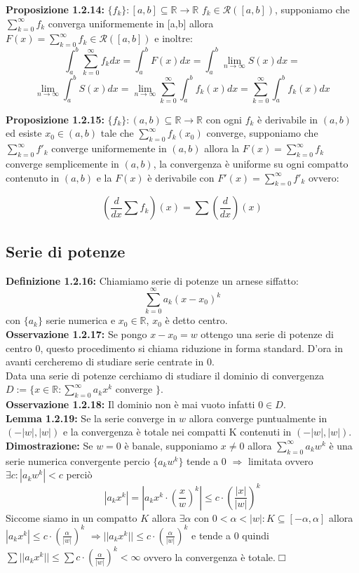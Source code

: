 \documentclass[a4paper,11pt,titlepage]{book}
\begin{document}
\textbf{Proposizione 1.2.14:}  $\{f_{k}\}:[a,b]\subseteq\mathbb{R}\to\mathbb{R}$ $f_k\in\mathcal{R}([a,b])$, supponiamo che $\sum_{k=0}^\infty f_{k}$ converga uniformemente in [a,b] allora $F(x)=\sum_{k=0}^\infty f_{k}\in\mathcal{R}([a,b])$ e inoltre: $$\int_a^b\sum_{k=0}^\infty f_{k}dx=\int_a^bF(x)dx=\int_a^b\lim\limits_{n\to\infty}S(x)dx=$$ $$\lim\limits_{n\to\infty}\int_a^b S(x)dx=\lim\limits_{n\to\infty}\sum_{k=0}^\infty\int_a^b f_k(x)dx=\sum_{k=0}^\infty\int_a^b f_k(x)dx$$ 

\textbf{Proposizione 1.2.15:} $\{f_{k}\}:(a,b)\subseteq\mathbb{R}\to\mathbb{R}$ con ogni $f_k$  è derivabile in $(a,b)$ ed esiste $x_0\in (a,b)$ tale che $\sum_{k=0}^\infty f_{k}(x_0)$ converge, supponiamo che $\sum_{k=0}^\infty f'_{k}$ converge uniformemente in $(a,b)$ allora la $F(x)=\sum_{k=0}^\infty f_{k}$ converge semplicemente in $(a,b)$, la convergenza è uniforme su ogni compatto contenuto in $(a,b)$ e la $F(x)$ è derivabile con $F'(x)=\sum_{k=0}^\infty f'_{k}$ ovvero: 

$$\left(\frac{d}{dx}\sum f_k\right)(x)=\sum\left(\frac{d}{dx}\right)(x)$$

\subsection{Serie di potenze}

\textbf{Definizione 1.2.16:} Chiamiamo serie di potenze un arnese siffatto: $$\sum_{k=0}^{\infty}a_k(x-x_0)^k$$ con $\{a_k\}$ serie numerica e $x_0\in\mathbb{R}$, $x_0$ è detto centro. \\

\textbf{Osservazione 1.2.17:} Se pongo $x-x_0=w$ ottengo una serie di potenze di centro 0, questo procedimento si chiama riduzione in forma standard. D'ora in avanti cercheremo di studiare serie centrate in 0. \\

Data una serie di potenze cerchiamo di studiare il dominio di convergenza $D:=\{x\in\mathbb{R}:\sum_{k=0}^{\infty}a_k x^k$ converge $\}$. \\

\textbf{Osservazione 1.2.18:} Il dominio non è mai vuoto infatti $0\in D$.\\

\textbf{Lemma 1.2.19:} Se la serie converge in $w$ allora converge puntualmente in $(-|w|,|w|)$ e la convergenza è totale nei compatti K contenuti in $(-|w|,|w|)$.\\

\textbf{Dimostrazione:} Se $w=0$ è banale, supponiamo $x\ne 0$ allora $\sum_{k=0}^{\infty}a_k w^k$ è una serie numerica convergente percio $\{a_k w^k\}$ tende a 0 $\Rightarrow$ limitata ovvero $\exists c:|a_k w^k|<c$ perciò $$|a_k x^k|=|a_k x^k\cdot\left (\frac{x}{w} \right )^k|\leq c \cdot \left(\frac{|x|}{|w|} \right)^k$$ Siccome siamo in un compatto $K$ allora $\exists\alpha$ con $0<\alpha <|w|:K\subseteq[-\alpha , \alpha]$ allora $|a_k x^k|\leq c \cdot \left(\frac{\alpha}{|w|} \right)^k$ $\Rightarrow ||a_k x^k||\leq c \cdot \left(\frac{\alpha}{|w|} \right)^k$ e tende a 0 quindi $\sum ||a_k x^k|| \leq \sum c \cdot \left(\frac{\alpha}{|w|} \right)^k<\infty$ ovvero la convergenza è totale.$\Box$ \\
\end{document}
